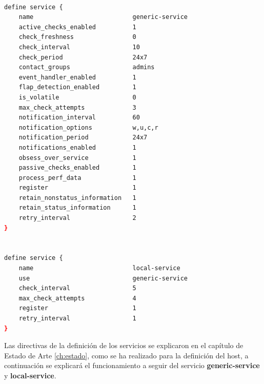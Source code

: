 \begin{lstlisting}[language=bash]

define service {
	name                           generic-service                     ; 
	active_checks_enabled          1                                   ; 
	check_freshness                0                                   ; 
	check_interval                 10                                  ; 
	check_period                   24x7                                ; 
	contact_groups                 admins                              ; 
	event_handler_enabled          1                                   ; 
	flap_detection_enabled         1                                   ; 
	is_volatile                    0                                   ; 
	max_check_attempts             3                                   ; 
	notification_interval          60                                  ; 
	notification_options           w,u,c,r                             ; 
	notification_period            24x7                                ; 
	notifications_enabled          1                                   ; 
	obsess_over_service            1                                   ; 
	passive_checks_enabled         1                                   ; 
	process_perf_data              1                                   ; 
	register                       1                                   ; 
	retain_nonstatus_information   1                                   ; 
	retain_status_information      1                                   ; 
	retry_interval                 2                                   ; 
}


define service {
	name                           local-service                       ; 
	use                            generic-service                     ; 
	check_interval                 5                                   ; 
	max_check_attempts             4                                   ; 
	register                       1                                   ; 
	retry_interval                 1                                   ; 
}

\end{lstlisting}
Las directivas de la definición de los servicios se explicaron en el capítulo de Estado de Arte \ref{ch:estado}, como se ha realizado para la definición del host, a continuación se explicará el funcionamiento a seguir del servicio \textbf{generic-service} y \textbf{local-service}.

